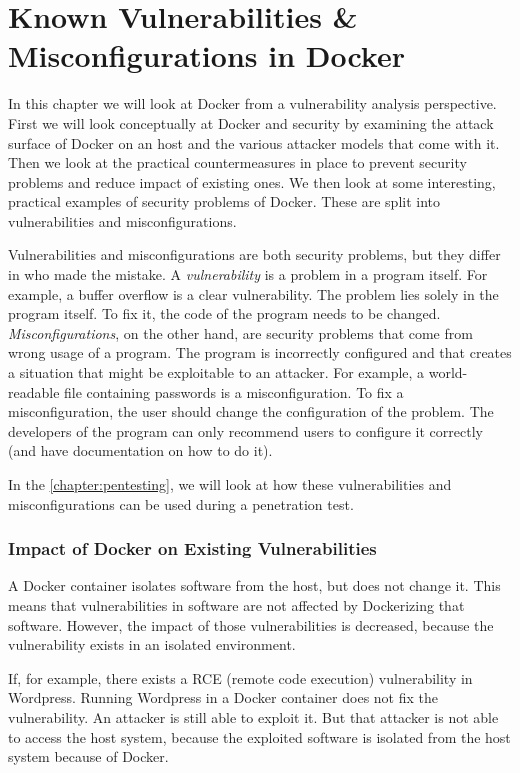 \chapter{Known Vulnerabilities \& Misconfigurations in Docker}\label{chapter:vulnerabilities-misconfigurations}
In this chapter we will look at Docker from a vulnerability analysis perspective. First we will look conceptually at Docker and security by examining the attack surface of Docker on an host and the various attacker models that come with it. Then we look at the practical countermeasures in place to prevent security problems and reduce impact of existing ones. We then look at some interesting, practical examples of security problems of Docker. These are split into vulnerabilities and misconfigurations.

\hfill

Vulnerabilities and misconfigurations are both security problems, but they differ in who made the mistake. A \emph{vulnerability} is a problem in a program itself. For example, a buffer overflow is a clear vulnerability. The problem lies solely in the program itself. To fix it, the code of the program needs to be changed. \emph{Misconfigurations}, on the other hand, are security problems that come from wrong usage of a program. The program is incorrectly configured and that creates a situation that might be exploitable to an attacker. For example, a world-readable file containing passwords is a misconfiguration. To fix a misconfiguration, the user should change the configuration of the problem. The developers of the program can only recommend users to configure it correctly (and have documentation on how to do it).

\hfill

In the \autoref{chapter:pentesting}, we will look at how these vulnerabilities and misconfigurations can be used during a penetration test.

\subsection*{Impact of Docker on Existing Vulnerabilities}
A Docker container isolates software from the host, but does not change it. This means that vulnerabilities in software are not affected by Dockerizing that software. However, the impact of those vulnerabilities is decreased, because the vulnerability exists in an isolated environment.

If, for example, there exists a RCE (remote code execution) vulnerability in Wordpress. Running Wordpress in a Docker container does not fix the vulnerability. An attacker is still able to exploit it. But that attacker is not able to access the host system, because the exploited software is isolated from the host system because of Docker.






